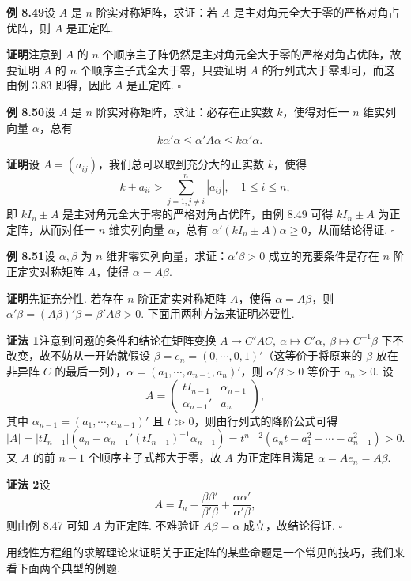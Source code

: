 \documentclass[UTF8,12pt,a4paper,fontset=fandol]{ctexart}
\begin{document}
\noindent\textbf{例 8.49}\quad 设 $A$ 是 $n$ 阶实对称矩阵，求证：若 $A$ 是主对角元全大于零的严格对角占优阵，则 $A$ 是正定阵.

\noindent\textbf{证明}\quad 注意到 $A$ 的 $n$ 个顺序主子阵仍然是主对角元全大于零的严格对角占优阵，故要证明 $A$ 的 $n$ 个顺序主子式全大于零，只要证明 $A$ 的行列式大于零即可，而这由例 3.83 即得，因此 $A$ 是正定阵. $\ensuremath{\square}$

\noindent\textbf{例 8.50}\quad 设 $A$ 是 $n$ 阶实对称矩阵，求证：必存在正实数 $k$，使得对任一 $n$ 维实列向量 $\alpha$，总有
\[
-k\alpha'\alpha\le \alpha'A\alpha\le k\alpha'\alpha.
\]

\noindent\textbf{证明}\quad 设 $A=(a_{ij})$，我们总可以取到充分大的正实数 $k$，使得
\[
k+a_{ii}>\sum_{j=1,j\ne i}^n |a_{ij}|,\quad 1\le i\le n,
\]
即 $kI_n\pm A$ 是主对角元全大于零的严格对角占优阵，由例 8.49 可得 $kI_n\pm A$ 为正定阵，从而对任一 $n$ 维实列向量 $\alpha$，总有 $\alpha'(kI_n\pm A)\alpha\ge 0$，从而结论得证. $\ensuremath{\square}$

\noindent\textbf{例 8.51}\quad 设 $\alpha,\beta$ 为 $n$ 维非零实列向量，求证：$\alpha'\beta>0$ 成立的充要条件是存在 $n$ 阶正定实对称矩阵 $A$，使得 $\alpha=A\beta$.

\noindent\textbf{证明}\quad 先证充分性. 若存在 $n$ 阶正定实对称矩阵 $A$，使得 $\alpha=A\beta$，则 $\alpha'\beta=(A\beta)'\beta=\beta'A\beta>0$. 下面用两种方法来证明必要性.

\noindent\textbf{证法 1}\quad 注意到问题的条件和结论在矩阵变换 $A\mapsto C'AC,\ \alpha\mapsto C'\alpha,\ \beta\mapsto C^{-1}\beta$ 下不改变，故不妨从一开始就假设 $\beta=e_n=(0,\cdots,0,1)'$（这等价于将原来的 $\beta$ 放在非异阵 $C$ 的最后一列），$\alpha=(a_1,\cdots,a_{n-1},a_n)'$，则 $\alpha'\beta>0$ 等价于 $a_n>0$. 设
\[
A=\left(\begin{array}{cc}
tI_{n-1} & \alpha_{n-1}\\
\alpha_{n-1}' & a_n
\end{array}\right),
\]
其中 $\alpha_{n-1}=(a_1,\cdots,a_{n-1})'$ 且 $t\gg 0$，则由行列式的降阶公式可得
\[
|A|=|tI_{n-1}|\left(a_n-\alpha_{n-1}'(tI_{n-1})^{-1}\alpha_{n-1}\right)
=t^{n-2}(a_nt-a_1^2-\cdots-a_{n-1}^2)>0.
\]
又 $A$ 的前 $n-1$ 个顺序主子式都大于零，故 $A$ 为正定阵且满足 $\alpha=Ae_n=A\beta$.

\noindent\textbf{证法 2}\quad 设
\[
A=I_n-\frac{\beta\beta'}{\beta'\beta}+\frac{\alpha\alpha'}{\alpha'\beta},
\]
则由例 8.47 可知 $A$ 为正定阵. 不难验证 $A\beta=\alpha$ 成立，故结论得证. $\ensuremath{\square}$

用线性方程组的求解理论来证明关于正定阵的某些命题是一个常见的技巧，我们来看下面两个典型的例题.
\end{document}
